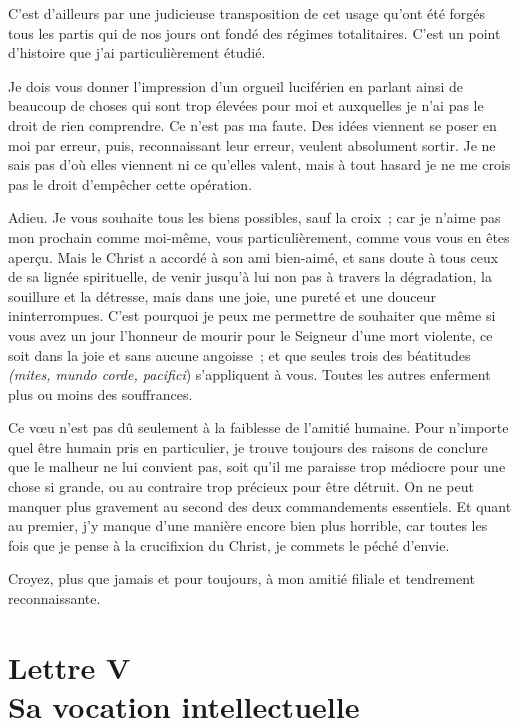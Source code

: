 \documentclass[french,twoside]{book} %
\newcommand{\signed}[1]{\bigbreak\filbreak{\raggedleft #1\par}\medskip}
\newcommand\chapteropen{} %
\newcommand\chapterclose{} %
\begin{document}
C'est d'ailleurs par une judicieuse transposition de cet usage qu'ont été forgés tous les partis qui de nos jours ont fondé des régimes totalitaires. C'est un point d'histoire que j'ai particulièrement étudié.\par
Je dois vous donner l'impression d'un orgueil luciférien en parlant ainsi de beaucoup de choses qui sont trop élevées pour moi et auxquelles je n'ai pas le droit de rien comprendre. Ce n'est pas ma faute. Des idées viennent se poser en moi par erreur, puis, reconnaissant leur erreur, veulent absolument sortir. Je ne sais pas d'où elles viennent ni ce qu'elles valent, mais à tout hasard je ne me crois pas le droit d'empêcher cette opération.\par
Adieu. Je vous souhaite tous les biens possibles, sauf la croix ; car je n'aime pas mon prochain comme moi-même, vous particulièrement, comme vous vous en êtes aperçu. Mais le Christ a accordé à son ami bien-aimé, et sans doute à tous ceux de sa lignée spirituelle, de venir jusqu'à lui non pas à travers la dégradation, la souillure et la détresse, mais dans une joie, une pureté et une douceur ininterrompues. C'est pourquoi je peux me permettre de souhaiter que même si vous avez un jour l'honneur de mourir pour le Seigneur d'une mort violente, ce soit dans la joie et sans aucune angoisse ; et que seules trois des béatitudes {\itshape (mites, mundo corde, pacifici}) s'appliquent à vous. Toutes les autres enferment plus ou moins des souffrances.\par
Ce vœu n'est pas dû seulement à la faiblesse de l'amitié humaine. Pour n'importe quel être humain pris en particulier, je trouve toujours des raisons de conclure que le malheur ne lui convient pas, soit qu'il me paraisse trop médiocre pour une chose si grande, ou au contraire trop précieux pour être détruit. On ne peut manquer plus gravement au second des deux commandements essentiels. Et quant au premier, j'y manque d'une manière encore bien plus horrible, car toutes les fois que je pense à la crucifixion du Christ, je commets le péché d'envie.\par
Croyez, plus que jamais et pour toujours, à mon amitié filiale et tendrement reconnaissante.\par


\signed{SIMONE WEIL.}
\chapterclose


\chapteropen
\chapter[Lettre V. Sa vocation intellectuelle]{Lettre V \\
Sa vocation intellectuelle}
\end{document}

